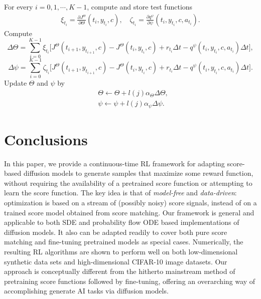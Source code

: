 \documentclass[11pt]{article}
\begin{document}
\begin{algorithm}[hbtp]
\begin{algorithmic}
{For every $i = 0,1,\cdots,K-1$, compute and store test functions
{
\begin{align*}
\xi_{t_i}= \frac{\partial J^{\Theta}}{\partial \Theta}(t_{i},y_{t_{i}}, c ),  \quad \zeta_{t_i} = \frac{\partial q^{\psi}}{\partial \psi}(t_{i}, y_{t_{i}}, c, a_{t_i}).
\end{align*}	
Compute  %
\[ \Delta \Theta = \sum_{i=0}^{K-1} \xi_{t_i} \big[ J^{\Theta}(t_{i+1}, y_{t_{i+1}}, c ) - J^{\Theta}(t_{i},y_{t_{i}}, c) + r_{t_i}\Delta t -q^{\psi}(t_{i}, y_{t_{i}}, c, a_{t_i})\Delta t  \big], \]
\[
\Delta \psi =   \sum_{i=0}^{K-1}\zeta_{t_i}\big[ J^{\Theta}(t_{i+1},y_{t_{i+1}}, c) - J^{\Theta}(t_{i}, y_{t_{i}}, c) + r_{t_i}\Delta t - q^{\psi}(t_{i},y_{t_{i}}, c, a_{t_i})\Delta t \big] .
\]
}
Update $\Theta$ and $\psi$ by
\begin{align*}
 &\Theta \leftarrow \Theta + l(j)\alpha_{\Theta} \Delta \Theta , \\
& \psi \leftarrow \psi + l(j)\alpha_{\psi} \Delta \psi .
\end{align*}

}
\ENDFOR
\end{algorithmic}
\label{algo-cond:offline episodic}
\end{algorithm}






\section{Conclusions}\label{sec:conclusion}
In this paper, we provide a continuous-time RL framework for adapting score-based diffusion models to generate samples that maximize some reward function, without requiring the availability of a pretrained score function or attempting to learn the score function. The key idea is that of {\it model-free} and {\it data-driven}: optimization is based on a stream of (possibly noisy) score signals, instead of on a trained score model obtained from score matching. Our framework is general and applicable to both SDE and probability flow ODE based implementations of diffusion models. It also can be adapted readily to cover both pure score matching and fine-tuning pretrained models as special cases. Numerically, the resulting RL algorithms are shown to perform well on both low-dimensional synthetic data sets and high-dimensional CIFAR-10 image datasets. Our approach is conceptually different from the hitherto mainstream method of pretraining score functions followed by fine-tuning, offering an overarching way of accomplishing  generate AI tasks via diffusion models.
\end{document}
